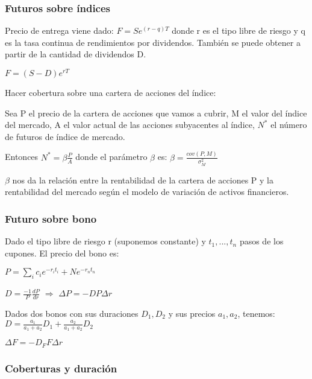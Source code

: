 \documentclass[
10pt, %
a4paper, %
oneside, %
headinclude,footinclude, %
BCOR5mm, %
]{scrartcl}
\newcommand{\sub}[1]{_{#1}}
\newcommand{\pot}[1]{^{#1}}
\newcommand{\f}[1]{{\large{${#1}$}}}
\newcommand{\sumatorio}[2]{\sum_{#1}^{#2}}
\newcommand{\ent}[0]{\Rightarrow}
\begin{document}
		\subsubsection{Futuros sobre índices}


			Precio de entrega viene dado: \f{F = Se\pot{(r-q)T}} donde r es el tipo libre de riesgo y q es la tasa continua de rendimientos por dividendos. También se puede obtener a partir de la cantidad de dividendos D. \begin{center} \f{F = (S-D)e\pot{rT}} \end{center}

			Hacer cobertura sobre una cartera de acciones del índice:

			Sea P el precio de la cartera de acciones que vamos a cubrir, M el valor del índice del mercado, A el valor actual de las acciones subyacentes al índice, \f{N\pot{*}} el número de futuros de índice de mercado.

			Entonces \f{N\pot{*} = \beta \frac{P}{A}} donde el parámetro \f{\beta} es: \f{\beta = \frac{cov(P,M)}{\sigma\pot{2}\sub{M}}}

			\f{\beta} nos da la relación entre la rentabilidad de la cartera de acciones P y la rentabilidad del mercado según el modelo de variación de activos financieros.

		\subsubsection{Futuro sobre bono}

			Dado el tipo libre de riesgo r (suponemos constante) y \f{t\sub{1},...,t\sub{n}} pasos de los cupones. El precio del bono es:
			\begin{center}\f{P = \sumatorio{i}{} c\sub{i}e\pot{-r\sub{i}t\sub{i}} + Ne\pot{-r\sub{n}t\sub{n}}}\end{center}

			\f{D = \frac{-1}{P} \frac{dP}{dr}} \f{\ent} \f{\Delta P = -DP \Delta r}

			Dados dos bonos con sus duraciones \f{D\sub{1},D\sub{2}} y sus precios \f{a\sub{1},a\sub{2}}, tenemos:\\
			\f{D = \frac{a\sub{1}}{a\sub{1}+a\sub{2}}D\sub{1} + \frac{a\sub{2}}{a\sub{1}+a\sub{2}}D\sub{2}}

			\f{\Delta F = -D\sub{F} F \Delta r}

		\subsubsection{Coberturas y duración}
\end{document}
